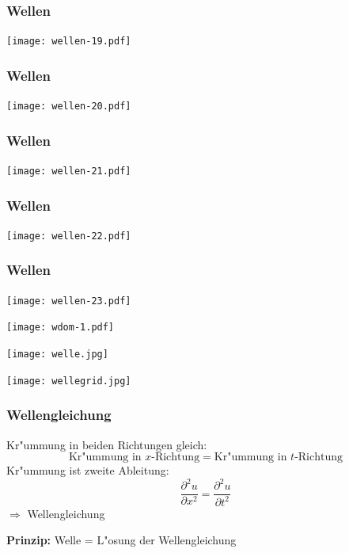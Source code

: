 \documentclass{beamer}
\begin{document}
\begin{frame}
\frametitle{Wellen}
\begin{center}
\texttt{[image: wellen-19.pdf]}
\end{center}
\end{frame}

\begin{frame}
\frametitle{Wellen}
\begin{center}
\texttt{[image: wellen-20.pdf]}
\end{center}
\end{frame}

\begin{frame}
\frametitle{Wellen}
\begin{center}
\texttt{[image: wellen-21.pdf]}
\end{center}
\end{frame}

\begin{frame}
\frametitle{Wellen}
\begin{center}
\texttt{[image: wellen-22.pdf]}
\end{center}
\end{frame}

\begin{frame}
\frametitle{Wellen}
\begin{center}
\texttt{[image: wellen-23.pdf]}
\end{center}
\end{frame}

\begin{frame}
\begin{center}
\texttt{[image: wdom-1.pdf]}
\end{center}
\end{frame}

\begin{frame}
\begin{center}
\texttt{[image: welle.jpg]}
\end{center}
\end{frame}

\begin{frame}
\begin{center}
\texttt{[image: wellegrid.jpg]}
\end{center}
\end{frame}

\begin{frame}
\frametitle{Wellengleichung}
Kr"ummung in beiden Richtungen gleich:
\[
\text{Kr"ummung in $x$-Richtung}
=
\text{Kr"ummung in $t$-Richtung}
\]
Kr"ummung ist zweite Ableitung:
\[
\frac{\partial^2 u}{\partial x^2}
=
\frac{\partial^2 u}{\partial t^2}
\]
$\Rightarrow$
Wellengleichung
\bigskip

{\bf Prinzip:}
Welle = L"osung der Wellengleichung
\end{frame}
\end{document}
